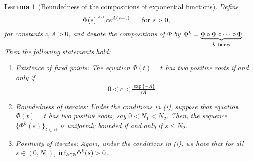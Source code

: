 \documentclass[reqno,11pt,final]{amsart}
\theoremstyle{plain}
\newtheorem{lemma}[theorem]{Lemma}
\numberwithin{equation}{section}
\numberwithin{theorem}{section}
\newcommand{\eqdef }{\overset{\mbox{\tiny{def}}}{=}}
\begin{document}
\begin{lemma}[Boundedness of the compositions of exponential functions]\label{Phi property}Define
\begin{align*}
    \Phi(s) \eqdef ce^{A(s+1)},\quad \textup{ for } s>0,
\end{align*}for constants $c,A>0$, and denote the compositions of $\Phi$ by $\Phi^k =\underbrace{\Phi\circ\Phi\circ\cdots\circ\Phi}_{k\textup{ times}} $. Then the following statements hold:
\begin{enumerate}[label=(\roman*)]
\item \textit{Existence of fixed points: }The equation $\Phi(t) = t$ has two positive roots if and only if 
\begin{align}\label{small c}
 0<c < \frac{\exp\{-A\}}{eA}.
\end{align}
\item \textit{Boundedness of iterates: }Under the conditions in (i), suppose that equation $\Phi(t)=t$ has two positive roots, say $0<N_1<N_2$. Then, the sequence $\{\Phi^k(s)\}_{k\in\mathbb{N}}$ is uniformly bounded if and only if $s\le N_2$.
\item \textit{Positivity of iterates: }Again, under the conditions in (i), we have that for all $s\in(0,N_2)$, $\textup{inf}_{k\in\mathbb{N}}\Phi^k(s)>0$.
\end{enumerate}
\end{lemma}
\end{document}
